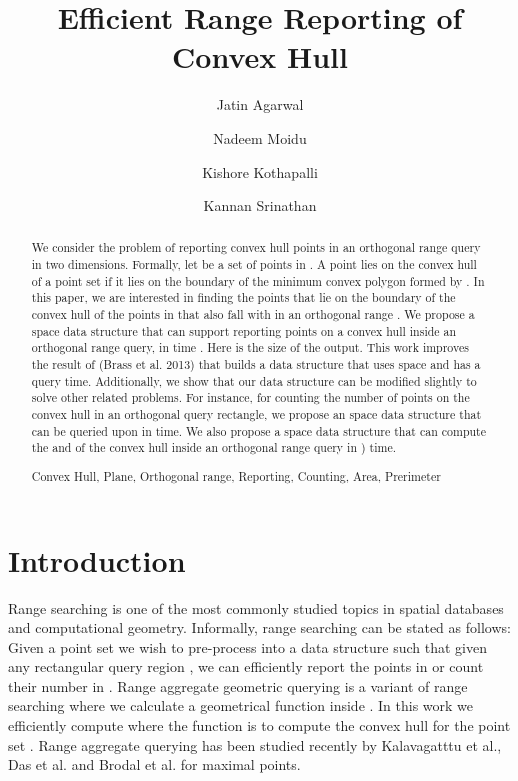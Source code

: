 \documentclass[runningheads,a4paper]{llncs}
\newcommand{\keywords}[1]{\par\addvspace\baselineskip
\noindent\keywordname\enspace\ignorespaces#1}
\begin{document}
\mainmatter  

\title{Efficient Range Reporting of Convex Hull}


\author{Jatin Agarwal \and Nadeem Moidu \and Kishore Kothapalli \and Kannan Srinathan}



\maketitle

\begin{abstract}

We consider the problem of reporting convex hull points in an orthogonal range query in two dimensions.
Formally, let  be a set of  points in .
A point lies on the convex hull of a  point set   if it lies on the
boundary of the minimum convex polygon formed by . In this paper, we
are interested in finding the points that lie on the boundary of the
convex hull of the points in  that also fall with in an orthogonal range
. 
We propose a  space data structure that can support reporting points on a convex hull inside
an orthogonal range query, in time . Here  is the size of the output.
This work improves the result of (Brass et al. 2013) \cite{brass} that
builds a data structure that uses  space and has a 
 query time. 
Additionally, we show that our data structure can be modified slightly to
solve other related problems. For instance, for counting the number of
points on the convex hull in an orthogonal query rectangle, we propose an
 space data structure that can be queried upon in  time. 
We also propose a  space data structure that can compute the 
and  of the convex hull inside an orthogonal range query in ) time.

\keywords{ Convex Hull, Plane, Orthogonal range, Reporting, Counting, Area, Prerimeter }
\end{abstract}


\section{Introduction}

\noindent Range searching is one of the most commonly studied topics in
spatial databases and computational geometry.  Informally, range searching can
be stated as follows: Given a point set  we wish to pre-process  into a
data structure such that given any rectangular query region , we can
efficiently report the points in  or count their number in . Range aggregate geometric querying is a variant of range searching where
we calculate a geometrical function  inside . In this work we
efficiently compute  where the function  is to compute the
convex hull for the point set . Range aggregate querying has been
studied recently by Kalavagatttu et al.\cite{Anil}, Das et al. \cite{asdas}
and Brodal et al. \cite{brodal} for maximal points.
\end{document}

